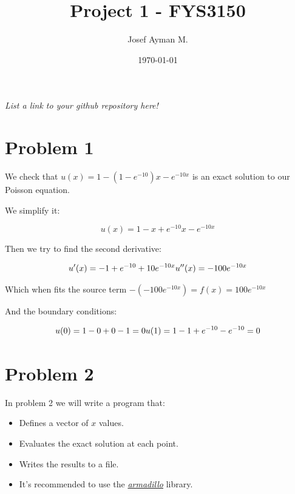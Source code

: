 \documentclass[english,notitlepage]{revtex4-1}  %
\begin{document}
\title{Project 1 - FYS3150}               %
\author{Josef Ayman M.}                      %
\date{\today}                             %
\noaffiliation                            %


\maketitle

\textit{List a link to your github repository here!}

\section*{Problem 1}
We check that $u(x) = 1 - (1 - e^{-10}) x - e^{-10 x}$ is an exact solution to our Poisson equation.

We simplify it:

\[
    u(x) = 1-x+e^{-10}x-e^{-10x}
\]

Then we try to find the second derivative:

\[
    u'(x)=-1+e^{-10}+10e^{-10x} \\
    u''(x) =-100e^{-10x}
\]


Which when fits the source term $-(-100e^{-10x}) = f(x) = 100e^{-10x}$

And the boundary conditions:

\[
    u(0)=1-0+0-1=0 \\
    u(1)=1-1+e^{-10}-e^{-10}=0
\]

\section*{Problem 2}
In problem 2 we will write a program that:

\begin{itemize}
    \item Defines a vector of $x$ values.
    \item Evaluates the exact solution at each point.
    \item Writes the results to a file.
    \item It's recommended to use the \textit{\href{https://arma.sourceforge.net/}{armadillo}} library.
\end{itemize}
\end{document}
